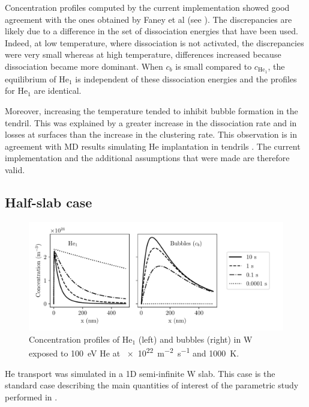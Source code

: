 Concentration profiles computed by the current implementation showed good agreement with the ones obtained by Faney et al \cite{faney_spatially_2015} (see ).
The discrepancies are likely due to a difference in the set of dissociation energies that have been used.
Indeed, at low temperature, where dissociation is not activated, the discrepancies were very small whereas at high temperature, differences increased because dissociation became more dominant.
When $c_b$ is small compared to $c_{\mathrm{He}_1}$, the equilibrium of $\mathrm{He}_1$ is independent of these dissociation energies and the profiles for $\mathrm{He}_1$ are identical.

Moreover, increasing the temperature tended to inhibit bubble formation in the tendril.
This was explained by a greater increase in the dissociation rate and in losses at surfaces than the increase in the clustering rate.
This observation is in agreement with MD results simulating He implantation in tendrils .
The current implementation and the additional assumptions that were made are therefore valid.

\subsection{Half-slab case} 

\begin{figure}
    \centering
    \includegraphics[width=\linewidth]{Figures/Chapter4/half_slab/profiles_half_slab.pdf}
    \caption{Concentration profiles of He$_1$ (left) and bubbles (right) in W exposed to \SI{100}{eV} He at \SI{e22}{m^{-2}.s^{-1}} and \SI{1000}{K}.}
\end{figure}

He transport was simulated in a 1D semi-infinite W slab.
This case is the standard case describing the main quantities of interest of the parametric study performed in .

